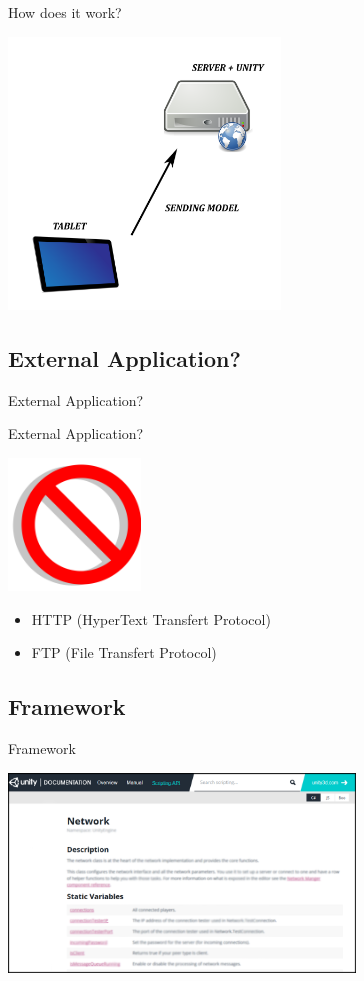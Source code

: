 \documentclass[a4paper,10pt]{beamer}
\begin{document}
			\begin{frame}{How does it work?}
				\centerline{\includegraphics[height=205pt]{images/network/sending_model.png}}
			\end{frame}
		
		\subsection{External Application?}
			
			\begin{frame}{External Application?}
				
			\end{frame}
			
			\begin{frame}{External Application?}
				\centerline{\includegraphics[height=100pt]{images/network/no.png}}
				\begin{itemize}
					\item HTTP (HyperText Transfert Protocol)
					\item FTP (File Transfert Protocol)
				\end{itemize}
			\end{frame}
		
		\subsection{Framework}
		
			\begin{frame}{Framework}
				\centerline{\includegraphics[height=150pt]{images/network/networkclass.png}}
			\end{frame}
	
\end{document}
